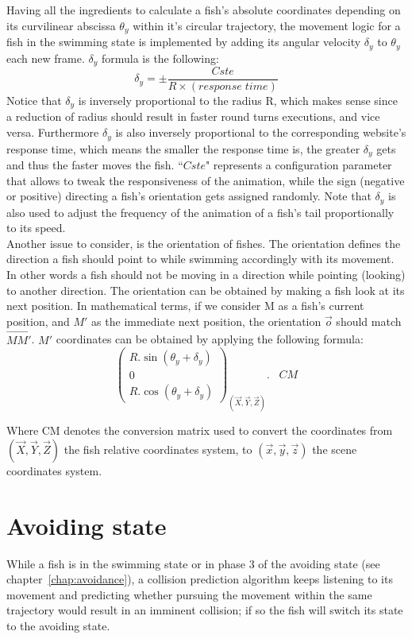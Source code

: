 Having all the ingredients to calculate a fish's absolute coordinates depending on its curvilinear abscissa $\theta_{y}$ within it's circular trajectory, the movement logic for a fish in the swimming state is implemented by adding its angular velocity $\delta_{y}$ to $\theta_{y}$ each new frame. $\delta_y$ formula is the following:
\[
\delta_y = \pm \frac{Cste}{R \times (response\; time)}
\]
Notice that $\delta_{y}$ is inversely proportional to the radius R, which makes sense since a reduction of radius should result in faster round turns executions, and vice versa. Furthermore $\delta_y$ is also inversely proportional to the corresponding website's response time, which means the smaller the response time is, the greater $\delta_{y}$ gets and thus the faster moves the fish. ``$Cste$" represents a configuration parameter that allows to tweak the responsiveness of the animation, while the sign (negative or positive) directing a fish's orientation gets assigned randomly. Note that $\delta_{y}$ is also used to adjust the frequency of the animation of a fish's tail proportionally to its speed.\\


Another issue to consider, is the orientation of fishes. The orientation defines the direction a fish should point to while swimming accordingly with its movement. In other words a fish should not be moving in a direction while pointing (looking) to another direction. The orientation can be obtained by making a fish look at its next position. In mathematical terms, if we consider M as a fish's current position, and $M'$ as the immediate next position, the orientation $\overrightarrow{o}$ should match $\overrightarrow{MM'}$. $M'$ coordinates can be obtained by applying the following formula:
\[
\begin{pmatrix}
R . \sin{(\theta_{y} + \delta_y)} \\
0 \\
R . \cos{(\theta_{y}  + \delta_y)}
\end{pmatrix}_{(\overrightarrow{X}, \overrightarrow{Y}, \overrightarrow{Z})} . \;\;\; CM
\]

Where CM denotes the conversion matrix used to convert the coordinates from $(\overrightarrow{X}, \overrightarrow{Y}, \overrightarrow{Z})$ the fish relative coordinates system, to $(\overrightarrow{x}, \overrightarrow{y}, \overrightarrow{z})$ the scene coordinates system.

\section{Avoiding state}
While a fish is in the swimming state or in phase 3 of the avoiding state (see chapter~\ref{chap:avoidance}), a collision prediction algorithm keeps listening to its movement and predicting whether pursuing the movement within the same trajectory would result in an imminent collision; if so the fish will switch its state to the avoiding state.

